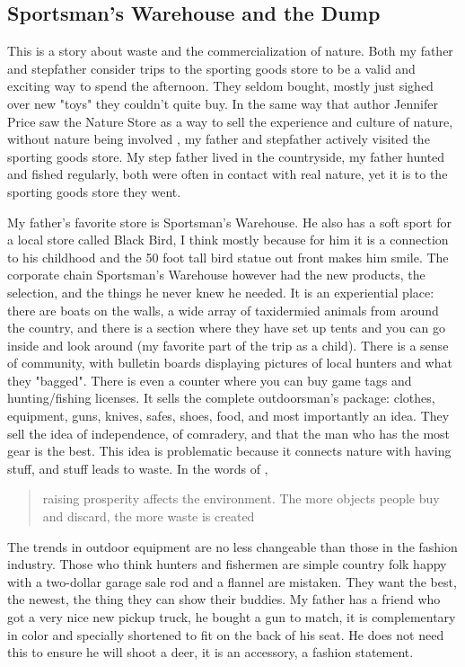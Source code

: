 \documentclass[
    a4paper,
    12pt,
    man,
    donotrepeattitle
]{apa6}
\let \cite \parencite
\begin{document}
\subsection{Sportsman's Warehouse and the Dump}

This is a story about waste and the commercialization of nature. Both my father
and stepfather consider trips to the sporting goods store to be a valid and
exciting way to spend the afternoon. They seldom bought, mostly just sighed
over new "toys" they couldn't quite buy. In the same way that author Jennifer
Price saw the Nature Store as a way to sell the experience and culture of
nature, without nature being involved \cite[pp. 186--196]{s9}, my father and 
stepfather actively visited the sporting goods store. My step father lived 
in the
countryside, my father hunted and fished regularly, both were often in contact
with real nature, yet it is to the sporting goods store they went.

My father's favorite store is Sportsman's Warehouse. He also has a soft sport
for a local store called Black Bird, I think mostly because for him it is
a connection to his childhood and the 50 foot tall bird statue out front makes
him smile. The corporate chain Sportsman's Warehouse however had the new
products, the selection, and the things he never knew he needed. It is an
experiential place: there are boats on the walls, a wide array of taxidermied
animals from around the country, and there is a section where they have set up
tents and you can go inside and look around (my favorite part of the trip as
a child). There is a sense of community, with bulletin boards displaying
pictures of local hunters and what they "bagged". There is even a counter where
you can buy game tags and hunting/fishing licenses. It sells the complete
outdoorsman's package: clothes, equipment, guns, knives, safes, shoes, food,
and most importantly an idea. They sell the idea of independence, of comradery,
and that the man who has the most gear is the best. This idea is problematic
because it connects nature with having stuff, and stuff leads to waste.
In the words of \textcite[p. 149]{s7}, \blockquote{raising prosperity affects 
the environment. The more objects people buy and discard, the more waste is 
created}. The trends in outdoor equipment
are no less changeable than those in the fashion industry. Those who think
hunters and fishermen are simple country folk happy with a two-dollar garage
sale rod and a flannel are mistaken. They want the best, the newest, the thing
they can show their buddies. My father has a friend who got a very nice new
pickup truck, he bought a gun to match, it is complementary in color and
specially shortened to fit on the back of his seat. He does not need this to
ensure he will shoot a deer, it is an accessory, a fashion statement.
\end{document}
